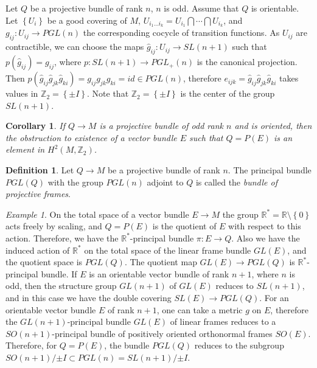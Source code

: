 \documentclass[12pt,letterpaper]{amsart}
\theoremstyle{definition}
\newtheorem{df}{Definition}
\theoremstyle{plain}
\newtheorem{cor}{Corollary}
\theoremstyle{remark}
\newtheorem{ex}{Example}
\begin{document}
Let $Q$ be a projective bundle of rank $n$, $n$ is odd.
Assume that $Q$ is orientable.
Let $\left\{ U_i \right\}$ be a good covering of $M$, $U_{i_1 \ldots i_k} = U_{i_1} \bigcap \cdots \bigcap U_{i_k}$, and $g_{ij} : U_{ij} \to PGL(n)$ the corresponding cocycle of transition functions.
As $U_{ij}$ are contractible, we can choose the maps $\hat{g}_{ij} : U_{ij} \to SL(n + 1)$ such that $p(\hat{g}_{ij}) = g_{ij}$, where $p : SL(n + 1) \to PGL_{+}(n)$ is the canonical projection.
Then $p(\hat{g}_{ij} \hat{g}_{jk} \hat{g}_{ki}) = g_{ij} g_{jk} g_{ki} = id \in PGL(n)$, therefore $e_{ijk} = \hat{g}_{ij} \hat{g}_{jk} \hat{g}_{ki}$ takes values in $\mathbb{Z}_2 = \left\{ \pm I \right\}$.
Note that $\mathbb{Z}_2 = \left\{ \pm I \right\}$ is the center of the group $SL(n + 1)$.
\begin{cor}
If $Q \to M$ is a projective bundle of odd rank $n$ and is oriented, then the obstruction to existence of a vector bundle $E$ such that $Q = P(E)$ is an element in $H^2(M, \mathbb{Z}_2)$.
\label{cor:2}
\end{cor}
\begin{df}
Let $Q \to M$ be a projective bundle of rank $n$.
The principal bundle $PGL(Q)$ with the group $PGL(n)$ adjoint to $Q$ is called the \emph{bundle of projective frames}.
\label{df:4}
\end{df}
\begin{ex}
On the total space of a vector bundle $E \to M$ the group $\mathbb{R}^{*} = \mathbb{R} \setminus \left\{ 0 \right\}$ acts freely by scaling, and $Q = P(E)$ is the quotient of $E$ with respect to this action.
Therefore, we have the $\mathbb{R}^{*}$-principal bundle $\pi : E \to Q$.
Also we have the induced action of $\mathbb{R}^{*}$ on the total space of the linear frame bundle $GL(E)$, and the quotient space is $PGL(Q)$.
The quotient map $GL(E) \to PGL(Q)$ is $\mathbb{R}^{*}$-principal bundle.
If $E$ is an orientable vector bundle of rank $n + 1$, where $n$ is odd, then the structure group $GL(n + 1)$ of $GL(E)$ reduces to $SL(n + 1)$, and in this case we have the double covering $SL(E) \to PGL(Q)$.
For an orientable vector bundle $E$ of rank $n + 1$, one can take a metric $g$ on $E$, therefore the $GL(n + 1)$-principal bundle $GL(E)$ of linear frames reduces to a $SO(n + 1)$-principal bundle of positively oriented orthonormal frames $SO(E)$.
Therefore, for $Q = P(E)$, the bundle $PGL(Q)$ reduces to the subgroup $SO(n + 1)/{\pm I} \subset PGL(n) = SL(n + 1)/{\pm I}$.
\label{ex:6}
\end{ex}
\end{document}
